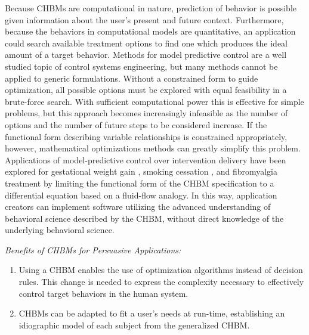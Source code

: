 \documentclass[runningheads,a4paper]{llncs}
\begin{document}
Because CHBMs are computational in nature, prediction of behavior is possible given information about the user's present and future context.
Furthermore, because the behaviors in computational models are quantitative, an application could search available treatment options to find one which produces the ideal amount of a target behavior.
Methods for model predictive control are a well studied topic of control systems engineering, but many methods cannot be applied to generic formulations.
Without a constrained form to guide optimization, all possible options must be explored with equal feasibility in a brute-force search.
With sufficient computational power this is effective for simple problems, but this approach becomes increasingly infeasible as the number of options and the number of future steps to be considered increase.
If the functional form describing variable relationships is constrained appropriately, however, mathematical optimizations methods can greatly simplify this problem.
Applications of model-predictive control over intervention delivery have been explored for gestational weight gain \cite{dong2013hybrid}, smoking cessation \cite{timms2014hybrid}, and fibromyalgia treatment \cite{deshpande2014optimized} by limiting the functional form of the CHBM specification to a differential equation based on a fluid-flow analogy.
In this way, application creators can implement software utilizing the advanced understanding of behavioral science described by the CHBM, without direct knowledge of the underlying behavioral science.


\emph{Benefits of CHBMs for Persuasive Applications:}
\begin{enumerate}
    \item Using a CHBM enables the use of optimization algorithms instead of decision rules. This change is needed to express the complexity necessary to effectively control target behaviors in the human system.
    \item CHBMs can be adapted to fit a user's needs at run-time, establishing an idiographic model of each subject from the generalized CHBM.
\end{enumerate}
\end{document}
